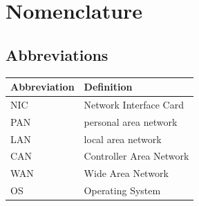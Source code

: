 \chapter*{Nomenclature}


\section*{Abbreviations}

\begin{longtable}{p{2.5cm}p{8cm}}
    \toprule
    Abbreviation & Definition             \\
    \midrule\endhead
    NIC          & Network Interface Card \\
    PAN          & personal area network  \\
    LAN          & local area network     \\
    CAN          & Controller Area Network\\
    WAN          & Wide Area Network      \\
    OS           & Operating System       \\
    
    \bottomrule
\end{longtable}


